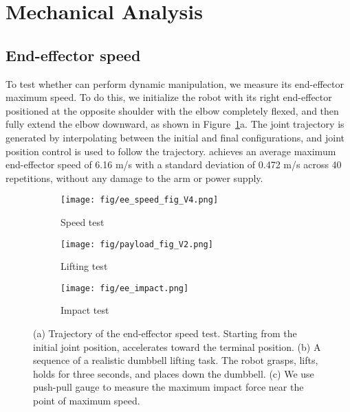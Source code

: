 \section{Mechanical Analysis}

\subsection{End-effector speed}

To test whether \robot can perform dynamic manipulation, we measure its end-effector maximum speed. To do this, we initialize the robot with its right end-effector positioned at the opposite shoulder with the elbow completely flexed, and then fully extend the elbow downward, as shown in Figure~\ref{fig:speed_payload_impact}a. The joint trajectory is generated by interpolating between the initial and final configurations, and joint position control is used to follow the trajectory. \robot achieves an average maximum end-effector speed of 6.16 m/s with a standard deviation of 0.472 m/s across 40 repetitions, without any damage to the arm or power supply.

\begin{figure}
    \begin{subfigure}[b]{0.47\linewidth}
        \centering
        \texttt{[image: fig/ee\_speed\_fig\_V4.png]}
        \caption{Speed test}
    \end{subfigure}
    \begin{subfigure}[b]{0.471\linewidth}
        \centering
        \texttt{[image: fig/payload\_fig\_V2.png]}
        \caption{Lifting test}
    \end{subfigure}
    \begin{subfigure}[t]{\linewidth}
        \centering
        \texttt{[image: fig/ee\_impact.png]}
        \caption{Impact test}
    \end{subfigure}
    \caption{(a) Trajectory of the end-effector speed test. Starting from the initial joint position, \robot accelerates toward the terminal position. (b) A sequence of a realistic dumbbell lifting task. The robot grasps, lifts, holds for three seconds, and places down the dumbbell. (c) We use push-pull gauge to measure the maximum impact force near the point of maximum speed.}
    \label{fig:speed_payload_impact}
\end{figure}



